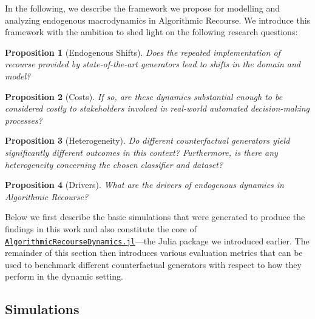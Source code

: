 \documentclass[conference,final,]{IEEEtran}
\newtheorem{proposition}{Proposition}[section]
\theoremstyle{definition}
\theoremstyle{definition}
\theoremstyle{definition}
\theoremstyle{definition}
\theoremstyle{remark}
\begin{document}
In the following, we describe the framework we propose for modelling and analyzing endogenous macrodynamics in Algorithmic Recourse. We introduce this framework with the ambition to shed light on the following research questions:

\begin{proposition}[Endogenous Shifts]
\protect\hypertarget{prp:shifts}{}\label{prp:shifts}Does the repeated implementation of recourse provided by state-of-the-art generators lead to shifts in the domain and model?
\end{proposition}

\begin{proposition}[Costs]
\protect\hypertarget{prp:costs}{}\label{prp:costs}If so, are these dynamics substantial enough to be considered costly to stakeholders involved in real-world automated decision-making processes?
\end{proposition}

\begin{proposition}[Heterogeneity]
\protect\hypertarget{prp:het}{}\label{prp:het}Do different counterfactual generators yield significantly different outcomes in this context? Furthermore, is there any heterogeneity concerning the chosen classifier and dataset?
\end{proposition}

\begin{proposition}[Drivers]
\protect\hypertarget{prp:drive}{}\label{prp:drive}What are the drivers of endogenous dynamics in Algorithmic Recourse?
\end{proposition}

Below we first describe the basic simulations that were generated to produce the findings in this work and also constitute the core of \href{https://anonymous.4open.science/r/AlgorithmicRecourseDynamics/README.md}{\texttt{AlgorithmicRecourseDynamics.jl}}---the Julia package we introduced earlier. The remainder of this section then introduces various evaluation metrics that can be used to benchmark different counterfactual generators with respect to how they perform in the dynamic setting.

\hypertarget{method-2-experiment}{%
\subsection{Simulations}\label{method-2-experiment}}
\end{document}
